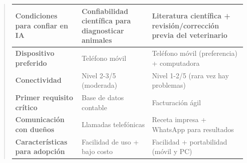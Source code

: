 \documentclass[
]{article}
\newcounter{none} %
\begin{document}
\begin{quote}
{\def\LTcaptype{none} %
\begin{longtable}[]{|
  >{\raggedright\arraybackslash}p{}|
  >{\raggedright\arraybackslash}p{}|
  >{\raggedright\arraybackslash}p{}|}
\hline
\begin{minipage}[b]{\linewidth}\raggedright
\textbf{Condiciones para confiar en IA}
\end{minipage} & \begin{minipage}[b]{\linewidth}\raggedright
Confiabilidad científica para diagnosticar animales
\end{minipage} & \begin{minipage}[b]{\linewidth}\raggedright
Literatura científica + revisión/corrección previa del veterinario
\end{minipage} \\
\hline
\endhead
\hline
\endlastfoot
\textbf{Dispositivo preferido} &
\begin{minipage}[t]{\linewidth}\raggedright
Teléfono móvil
\end{minipage} & \begin{minipage}[t]{\linewidth}\raggedright
Teléfono móvil (preferencia) + computadora
\end{minipage} \\
\hline
\textbf{Conectividad} & \begin{minipage}[t]{\linewidth}\raggedright
Nivel 2-3/5 (moderada)
\end{minipage} & \begin{minipage}[t]{\linewidth}\raggedright
Nivel 1-2/5 (rara vez hay problemas)
\end{minipage} \\
\hline
\textbf{Primer requisito crítico} &
\begin{minipage}[t]{\linewidth}\raggedright
Base de datos contable
\end{minipage} & \begin{minipage}[t]{\linewidth}\raggedright
Facturación ágil
\end{minipage} \\
\hline
\textbf{Comunicación con dueños} &
\begin{minipage}[t]{\linewidth}\raggedright
Llamadas telefónicas
\end{minipage} & \begin{minipage}[t]{\linewidth}\raggedright
Receta impresa + WhatsApp para resultados
\end{minipage} \\
\hline
\textbf{Características para adopción} &
\begin{minipage}[t]{\linewidth}\raggedright
Facilidad de uso + bajo costo
\end{minipage} & \begin{minipage}[t]{\linewidth}\raggedright
Facilidad + portabilidad (móvil y PC)
\end{minipage} \\
\hline
\end{longtable}
}


\end{quote}
\end{document}
